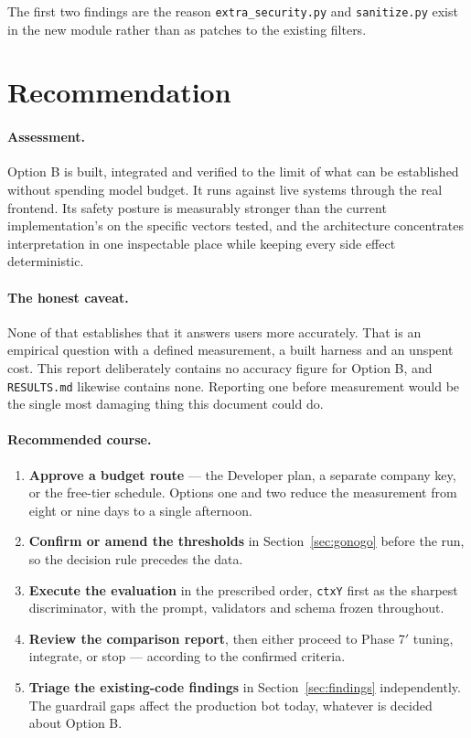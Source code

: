\documentclass[11pt,a4paper]{article}
\newcommand{\fn}[1]{\texttt{\small #1}}
\begin{document}
The first two findings are the reason \fn{extra\_security.py} and \fn{sanitize.py} exist in
the new module rather than as patches to the existing filters.

\section{Recommendation}

\paragraph{Assessment.} Option B is built, integrated and verified to the limit of what can be
established without spending model budget. It runs against live systems through the real
frontend. Its safety posture is measurably stronger than the current implementation's on the
specific vectors tested, and the architecture concentrates interpretation in one inspectable
place while keeping every side effect deterministic.

\paragraph{The honest caveat.} None of that establishes that it answers users more accurately.
That is an empirical question with a defined measurement, a built harness and an unspent cost.
This report deliberately contains no accuracy figure for Option B, and
\fn{RESULTS.md} likewise contains none. Reporting one before measurement would be the single
most damaging thing this document could do.

\paragraph{Recommended course.}

\begin{enumerate}[leftmargin=1.6em,itemsep=3pt]
\item \textbf{Approve a budget route} --- the Developer plan, a separate company key, or the
free-tier schedule. Options one and two reduce the measurement from eight or nine days to a
single afternoon.

\item \textbf{Confirm or amend the thresholds} in Section~\ref{sec:gonogo} before the run, so
the decision rule precedes the data.

\item \textbf{Execute the evaluation} in the prescribed order, \fn{ctxY} first as the sharpest
discriminator, with the prompt, validators and schema frozen throughout.

\item \textbf{Review the comparison report}, then either proceed to Phase 7$'$ tuning,
integrate, or stop --- according to the confirmed criteria.

\item \textbf{Triage the existing-code findings} in Section~\ref{sec:findings} independently. The guardrail
gaps affect the production bot today, whatever is decided about Option B.
\end{enumerate}
\end{document}

